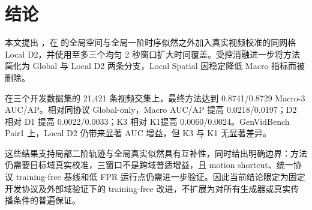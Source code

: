 \section{结论}
\label{sec:conclusion}

本文提出 \method，在 \stall 的全局空间与全局一阶时序似然之外加入真实视频校准的同网格 Local D2，并使用至多三个均匀 2 秒窗口扩大时间覆盖。受控消融进一步将方法简化为 Global 与 Local D2 两条分支，Local Spatial 因稳定降低 Macro 指标而被删除。

在三个开发数据集的 21,421 条视频交集上，最终方法达到 0.8741/0.8729 Macro-3 AUC/AP。相对同协议 Global-only，Macro AUC/AP 提高 0.0218/0.0197；D2 相对 D1 提高 0.0022/0.0033；K3 相对 K1提高 0.0060/0.0024。GenVidBench Pair1 上，Local D2 仍带来显著 AUC 增益，但 K3 与 K1 无显著差异。

这些结果支持局部二阶轨迹与全局真实似然具有互补性，同时给出明确边界：方法仍需要目标域真实校准，三窗口不是跨域普适增益，且 motion shortcut、统一协议 training-free 基线和低 FPR 运行点仍需进一步验证。因此当前结论限定为固定开发协议及外部域验证下的 training-free 改进，不扩展为对所有生成器或真实传播条件的普遍保证。
